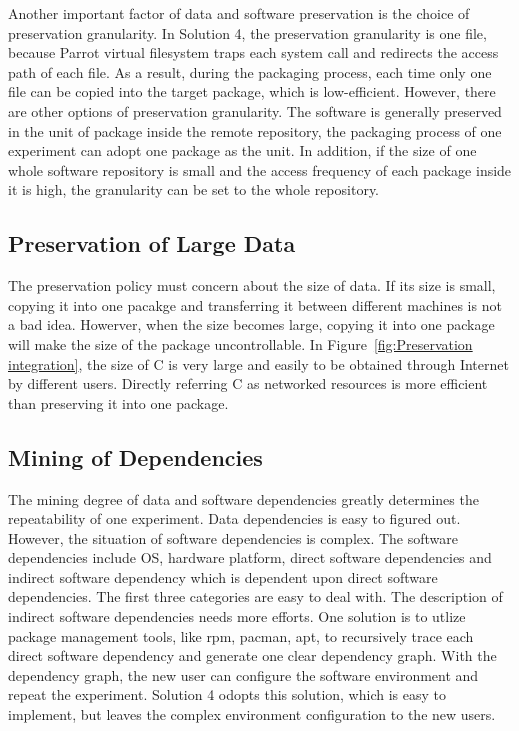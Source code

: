 \documentclass{acm_proc_article-sp}
\begin{document}
Another important factor of data and software preservation is the choice of
preservation granularity. In Solution 4, the preservation granularity is one
file, because Parrot virtual filesystem traps each system call and redirects
the access path of each file. As a result, during the packaging process, each
time only one file can be copied into the target package, which is
low-efficient. However, there are other options of preservation granularity.
The software is generally preserved in the unit of package inside the remote
repository, the packaging process of one experiment can adopt one package as
the unit. In addition, if the size of one whole software repository is small
and the access frequency of each package inside it is high, the granularity can
be set to the whole repository.

\subsection{Preservation of Large Data}

The preservation policy must concern about the size of data. If its size is
small, copying it into one pacakge and transferring it between different
machines is not a bad idea. Howerver, when the size becomes large, copying it
into one package will make the size of the package uncontrollable. In
Figure~\ref{fig:Preservation integration}, the size of C is very large and
easily to be obtained through Internet by different users. Directly referring C
as networked resources is more efficient than preserving it into one package.

\subsection{Mining of Dependencies} 

The mining degree of data and software dependencies greatly determines the
repeatability of one experiment. Data dependencies is easy to figured out. However, the situation of software dependencies is complex. The software
dependencies include OS, hardware platform, 
direct software dependencies and indirect software dependency which is dependent upon direct software dependencies.
The first
three categories are easy to deal with. The description of indirect software
dependencies needs more efforts. One solution is to utlize package management
tools, like rpm, pacman, apt, to recursively trace each direct software
dependency and generate one clear dependency graph. With the dependency graph,
the new user can configure the software environment and repeat the experiment.
Solution 4 odopts this solution, which is easy to implement, but leaves the
complex environment configuration to the new users. 
\end{document}
